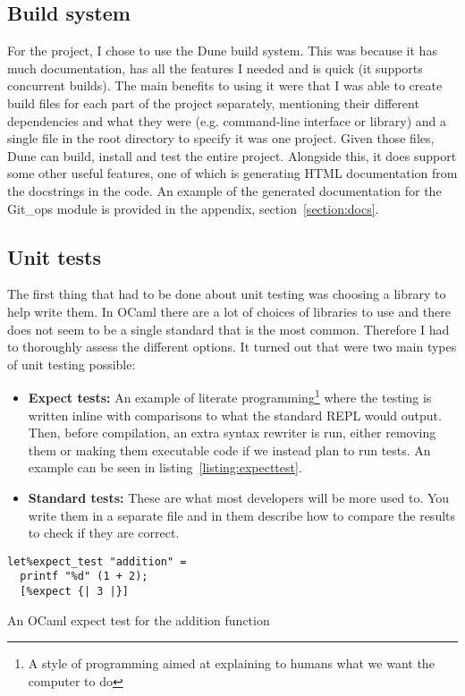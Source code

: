 \subsection{Build system}

For the project, I chose to use the Dune\cite{code_dune} build system. This was because it has much documentation, has all the features I needed and is quick (it supports concurrent builds). The main benefits to using it were that I was able to create build files for each part of the project separately, mentioning their different dependencies and what they were (e.g. command-line interface or library) and a single file in the root directory to specify it was one project. Given those files, Dune can build, install and test the entire project. Alongside this, it does support some other useful features, one of which is generating HTML documentation from the docstrings in the code. An example of the generated documentation for the Git\_ops module is provided in the appendix, section\unskip~\ref{section:docs}.

\subsection{Unit tests}

The first thing that had to be done about unit testing was choosing a library to help write them. In OCaml there are a lot of choices of libraries to use and there does not seem to be a single standard that is the most common. Therefore I had to thoroughly assess the different options. It turned out that were two main types of unit testing possible:
\begin{itemize}
  \item \textbf{Expect tests:} An example of literate programming\footnote{A style of programming aimed at explaining to humans what we want the computer to do\cite{Knuth1984}} where the testing is written inline with comparisons to what the standard REPL would output. Then, before compilation, an extra syntax rewriter is run, either removing them or making them executable code if we instead plan to run tests. An example can be seen in listing\unskip~\ref{listing:expecttest}.
  \item \textbf{Standard tests:} These are what most developers will be more used to. You write them in a separate file and in them describe how to compare the results to check if they are correct.
\end{itemize}

\begin{listing}[h]
\begin{verbatim}
let%expect_test "addition" =
  printf "%d" (1 + 2);
  [%expect {| 3 |}]
\end{verbatim}
\caption{An OCaml expect test for the addition function}
\label{listing:expecttest}
\end{listing}

